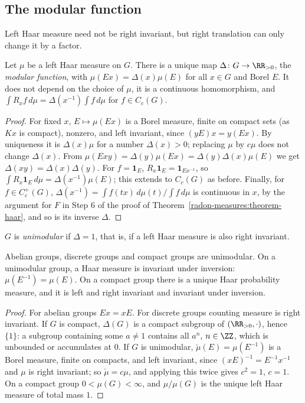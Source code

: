 \subsection{The modular function}\label{radon-measures:subsection-modular}

Left Haar measure need not be right invariant, but right translation can only change it by a factor.

\begin{proposition}\label{radon-measures:proposition-modular}
Let $\mu$ be a left Haar measure on $G$. There is a unique map $\Delta \colon G \to \RR_{>0}$, the \emph{modular function}, with $\mu(Ex) = \Delta(x)\mu(E)$ for all $x \in G$ and Borel $E$. It does not depend on
the choice of $\mu$, it is a continuous homomorphism, and $\int R_xf\,d\mu = \Delta(x^{-1})\int f\,d\mu$ for $f \in C_c(G)$.
\end{proposition}

\begin{proof}
For fixed $x$, $E \mapsto \mu(Ex)$ is a Borel measure, finite on compact sets (as $Kx$ is compact), nonzero, and left invariant, since $(yE)x = y(Ex)$. By uniqueness it is $\Delta(x)\mu$ for a number
$\Delta(x) > 0$; replacing $\mu$ by $c\mu$ does not change $\Delta(x)$. From $\mu(Exy) = \Delta(y)\mu(Ex) = \Delta(y)\Delta(x)\mu(E)$ we get $\Delta(xy) = \Delta(x)\Delta(y)$. For $f = \mathbf{1}_E$,
$R_x\mathbf{1}_E = \mathbf{1}_{Ex^{-1}}$, so $\int R_x\mathbf{1}_E\,d\mu = \Delta(x^{-1})\mu(E)$; this extends to $C_c(G)$ as before. Finally, for $f \in C_c^+(G)$, $\Delta(x^{-1}) = \int f(tx)\,d\mu(t)/\int f\,d\mu$
is continuous in $x$, by the argument for $F$ in Step 6 of the proof of Theorem~\ref{radon-measures:theorem-haar}, and so is its inverse $\Delta$.
\end{proof}

$G$ is \emph{unimodular} if $\Delta = 1$, that is, if a left Haar measure is also right invariant.

\begin{corollary}\label{radon-measures:corollary-unimodular}
Abelian groups, discrete groups and compact groups are unimodular. On a unimodular group, a Haar measure is invariant under inversion: $\mu(E^{-1}) = \mu(E)$. On a compact group there is a unique Haar
probability measure, and it is left and right invariant and invariant under inversion.
\end{corollary}

\begin{proof}
For abelian groups $Ex = xE$. For discrete groups counting measure is right invariant. If $G$ is compact, $\Delta(G)$ is a compact subgroup of $(\RR_{>0}, \cdot)$, hence $\{1\}$: a subgroup containing some
$a \neq 1$ contains all $a^n$, $n \in \ZZ$, which is unbounded or accumulates at $0$. If $G$ is unimodular, $\check\mu(E) = \mu(E^{-1})$ is a Borel measure, finite on compacts, and left invariant,
since $(xE)^{-1} = E^{-1}x^{-1}$ and $\mu$ is right invariant; so $\check\mu = c\mu$, and applying this twice gives $c^2 = 1$, $c = 1$. On a compact group $0 < \mu(G) < \infty$, and $\mu/\mu(G)$ is the
unique left Haar measure of total mass $1$.
\end{proof}

